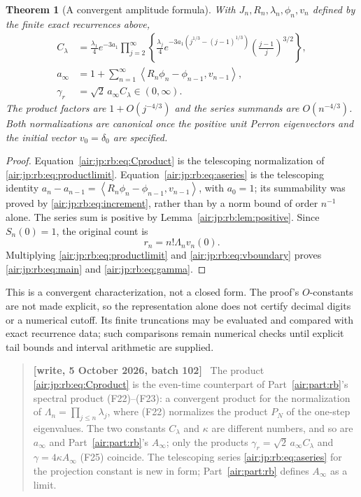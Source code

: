 \documentclass[11pt,letterpaper]{article}
\numberwithin{equation}{section}
\newtheorem{theorem}{Theorem}[section]
\theoremstyle{remark}
\newcommand{\ip}[2]{\left\langle#1,#2\right\rangle}
\newenvironment{writenotejp}{\par\smallskip\begin{quote}\small\textbf{[write, 5 October 2026, batch 102]}\ }{\end{quote}\smallskip}
\begin{document}
\begin{theorem}[A convergent amplitude formula]\label{air:jp:rb:thm:representation}
With $J_n,R_n,\lambda_n,\phi_n,v_n$ defined by the finite exact recurrences above,
\begin{align}
 C_\lambda
 &=\frac{\lambda_1}{4}e^{-3a_1}
 \prod_{j=2}^\infty\left\{
 \frac{\lambda_j}{4}
 e^{-3a_1(j^{1/3}-(j-1)^{1/3})}
 \left(\frac{j-1}{j}\right)^{3/2}\right\},\label{air:jp:rb:eq:Cproduct}\\
 a_\infty
 &=1+\sum_{n=1}^\infty
 \ip{R_n\phi_n-\phi_{n-1}}{v_{n-1}},\label{air:jp:rb:eq:aseries}\\
 \gamma_r&=\sqrt2\,a_\infty C_\lambda\in(0,\infty).\label{air:jp:rb:eq:gamma}
\end{align}
The product factors are $1+O(j^{-4/3})$ and the series summands are $O(n^{-4/3})$. Both normalizations are canonical once the positive unit Perron eigenvectors and the initial vector $v_0=\delta_0$ are specified.
\end{theorem}
\begin{proof}
Equation~\eqref{air:jp:rb:eq:Cproduct} is the telescoping normalization of \eqref{air:jp:rb:eq:productlimit}. Equation~\eqref{air:jp:rb:eq:aseries} is the telescoping identity $a_n-a_{n-1}=\ip{R_n\phi_n-\phi_{n-1}}{v_{n-1}}$, with $a_0=1$; its summability was proved by \eqref{air:jp:rb:eq:increment}, rather than by a norm bound of order $n^{-1}$ alone. The series sum is positive by Lemma~\ref{air:jp:rb:lem:positive}. Since $S_n(0)=1$, the original count is
\[
 r_n=n!\Lambda_nv_n(0).
\]
Multiplying \eqref{air:jp:rb:eq:productlimit} and \eqref{air:jp:rb:eq:vboundary} proves \eqref{air:jp:rb:eq:main} and \eqref{air:jp:rb:eq:gamma}.
\end{proof}

This is a convergent characterization, not a closed form. The proof's $O$-constants are not made explicit, so the representation alone does not certify decimal digits or a numerical cutoff. Its finite truncations may be evaluated and compared with exact recurrence data; such comparisons remain numerical checks until explicit tail bounds and interval arithmetic are supplied.
\begin{writenotejp}
The product \eqref{air:jp:rb:eq:Cproduct} is the even-time counterpart of Part~\ref{air:part:rb}'s spectral product (F22)--(F23): a convergent product for the normalization of $\Lambda_n=\prod_{j\le n}\lambda_j$, where (F22) normalizes the product $P_N$ of the one-step eigenvalues. The two constants $C_\lambda$ and $\kappa$ are different numbers, and so are $a_\infty$ and Part~\ref{air:part:rb}'s $A_\infty$; only the products $\gamma_r=\sqrt2\,a_\infty C_\lambda$ and $\gamma=4\kappa A_\infty$ (F25) coincide. The telescoping series \eqref{air:jp:rb:eq:aseries} for the projection constant is new in form; Part~\ref{air:part:rb} defines $A_\infty$ as a limit.
\end{writenotejp}
\end{document}

